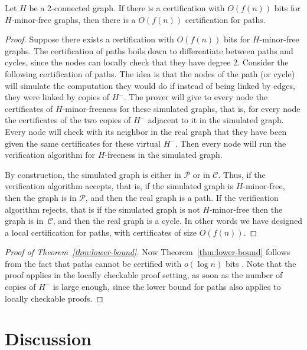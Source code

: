 \documentclass[a4paper,thm-restate,USenglish]{lipics-v2019}
\newcommand{\Hm}{H^{-}}
\begin{document}
\begin{lemma}
\label{lem:reduction-path}
Let $H$ be a 2-connected graph.
If there is a certification with $O(f(n))$ bits for $H$-minor-free graphs, then there is a $O(f(n))$ certification for paths.
\end{lemma}

\begin{proof}
Suppose there exists a certification with $O(f(n))$ bits for $H$-minor-free graphs.
The certification of paths boils down to differentiate between paths and cycles, since the nodes can locally check that they have degree 2. Consider the following certification of paths. 
The idea is that the nodes of the path (or cycle) will simulate the computation they would do if instead of being linked by edges, they were linked by copies of $\Hm$. 
The prover will give to every node the certificates of $H$-minor-freeness for these simulated graphs, that is, for every node the certificates of the two copies of $\Hm$ adjacent to it in the simulated graph. Every node will check with its neighbor in the real graph that they have been given the same certificates for these virtual $\Hm$. 
Then every node will run the verification algorithm for $H$-freeness in the simulated graph. 

By construction, the simulated graph is either in $\mathcal{P}$ or in $\mathcal{C}$. Thus, if the verification algorithm accepts, that is, if the simulated graph is $H$-minor-free, then the graph is in $\mathcal{P}$, and then the real graph is a path. 
If the verification algorithm rejects, that is if the simulated graph is not $H$-minor-free then the graph is in~$\mathcal{C}$, and then the real graph is a cycle.
In other words we have designed a local certification for paths, with certificates of size $O(f(n))$.
\end{proof}

\begin{proof}[Proof of Theorem~\ref{thm:lower-bound}]
Now Theorem~\ref{thm:lower-bound} follows from the fact that paths cannot be certified with $o(\log n)$ bits \cite{KormanKP10, GoosS16}.
Note that the proof applies in the locally checkable proof setting, as soon as the number of copies of $\Hm$ is large enough, since the lower bound for paths also applies to locally checkable proofs.
\end{proof}


\section{Discussion}
\label{sec:discussion}
\end{document}
